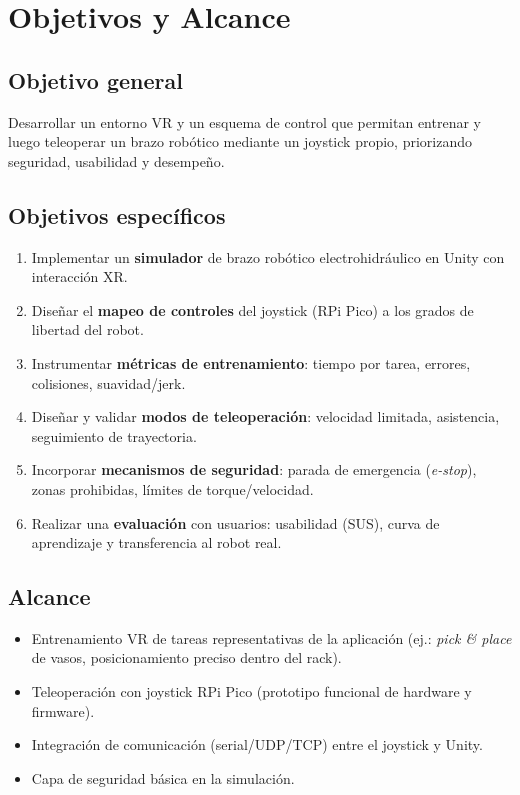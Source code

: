 
\section{Objetivos y Alcance}

\subsection{Objetivo general}

Desarrollar un entorno VR y un esquema de control que permitan entrenar y luego teleoperar un brazo robótico mediante un joystick propio, priorizando seguridad, usabilidad y desempeño.

\subsection{Objetivos específicos}

\begin{enumerate}
    \item Implementar un \textbf{simulador} de brazo robótico electrohidráulico en Unity con interacción XR.
    \item Diseñar el \textbf{mapeo de controles} del joystick (RPi Pico) a los grados de libertad del robot.
    \item Instrumentar \textbf{métricas de entrenamiento}: tiempo por tarea, errores, colisiones, suavidad/jerk.
    \item Diseñar y validar \textbf{modos de teleoperación}: velocidad limitada, asistencia, seguimiento de trayectoria.
    \item Incorporar \textbf{mecanismos de seguridad}: parada de emergencia (\textit{e-stop}), zonas prohibidas, límites de torque/velocidad.
    \item Realizar una \textbf{evaluación} con usuarios: usabilidad (SUS), curva de aprendizaje y transferencia al robot real.
\end{enumerate}

\subsection{Alcance}

\begin{itemize}
    \item Entrenamiento VR de tareas representativas de la aplicación (ej.: \textit{pick \& place} de vasos, posicionamiento preciso dentro del rack).
    \item Teleoperación con joystick RPi Pico (prototipo funcional de hardware y firmware).
    \item Integración de comunicación (serial/UDP/TCP) entre el joystick y Unity.
    \item Capa de seguridad básica en la simulación.
\end{itemize}

